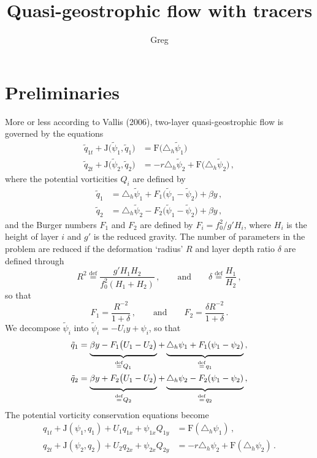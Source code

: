 \documentclass[12pt, oneside]{article}
\newcommand*\mystrut[1]{\vrule width0pt height0pt depth#1\relax}
\newcommand{\com}{\, ,}
\newcommand{\per}{\, .}
\newcommand{\defn}{\ensuremath{\stackrel{\mathrm{def}}{=}}}
\newcommand{\beq}{\begin{equation}}
\newcommand{\eeq}{\end{equation}}
\newcommand{\hlap}{\triangle_h}
\newcommand{\J}{\mathrm{J}}
\newcommand{\friction}{\mathrm{F}}
\newcommand{\q}{\tilde q}
\newcommand{\qpsi}{\tilde \psi}
\begin{document}
\title{\vspace{-4ex} Quasi-geostrophic flow with tracers}
\author{Greg}
\date{} \maketitle \vspace{-4ex}

\section{Preliminaries}

More or less according to Vallis (2006), two-layer quasi-geostrophic flow is governed by the equations
\begin{align}
\q_{1t} + \J \big ( \qpsi_1, \q_1 \big ) &= \friction \big ( \hlap \qpsi_1 \big ) \\
\q_{2t} + \J \big ( \qpsi_2, \q_2 \big ) &= -r \hlap \qpsi_2 + \friction  \big( \hlap \qpsi_2 \big ) \com 
\end{align}
where the potential vorticities $Q_i$ are defined by
\begin{align}
\q_{1} &= \hlap \qpsi_1 + F_1 \big ( \qpsi_1 - \qpsi_2 \big ) + \beta y \com \\
\q_2 &= \hlap \qpsi_2 - F_2 \big ( \qpsi_1 - \qpsi_2 \big ) + \beta y \com
\end{align}
and the Burger numbers $F_1$ and $F_2$ are defined by $F_i = f_0^2 / g' H_i$, where $H_i$ is the height of layer $i$ and $g'$ is the reduced gravity. The number of parameters in the problem are reduced if the deformation `radius' $R$ and layer depth ratio $\delta$ are defined through
\beq  
R^2 \defn \frac{g' H_1 H_2}{f_0^2 \left ( H_1 + H_2 \right )} \com \qquad \text{and} \qquad \delta \defn \frac{H_1}{H_2} \com
\eeq
so that 
\beq
F_1 = \frac{R^{-2}}{1 + \delta} \com \qquad \text{and} \qquad F_2 = \frac{\delta R^{-2}}{1 + \delta} \per
\eeq
We decompose $\qpsi_i$ into $\qpsi_i = - U_i y + \psi_i$, so that
\begin{align}
\q_1 &= \underbrace{\mystrut{1.4ex}  \beta y - F_1 \big ( U_1 - U_2 \big )}_{\defn Q_1} + \underbrace{\mystrut{1.4ex} \hlap \psi_1 + F_1 ( \psi_1 - \psi_2 )}_{\defn q_1} \com \\
\q_2 &= \underbrace{\mystrut{1.4ex}  \beta y + F_2 \big ( U_1 - U_2 \big )}_{\defn Q_2} + \underbrace{\mystrut{1.4ex} \hlap \psi_2 - F_2 ( \psi_1 - \psi_2 )}_{\defn q_2} \com
\end{align}
The potential vorticity conservation equations become
\begin{align}
q_{1t} + \J \left( \psi_1, q_1 \right ) + U_1 q_{1x} + \psi_{1x} Q_{1y} &= \friction \left ( \hlap \psi_1 \right) \com \\
 q_{2t} + \J \left( \psi_2, q_2 \right ) + U_2 q_{2x} + \psi_{2x} Q_{2y} &= - r \hlap \psi_2 + \friction \left ( \hlap \psi_2 \right) \per
\end{align}
\end{document}
